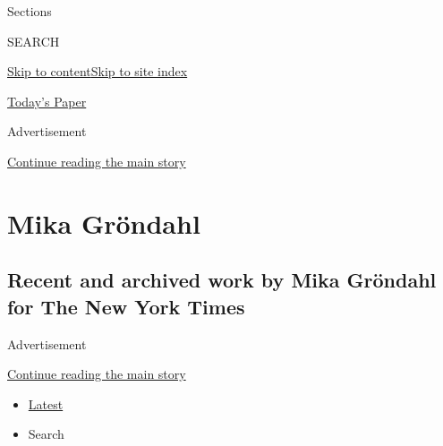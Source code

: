 Sections

SEARCH

\protect\hyperlink{site-content}{Skip to
content}\protect\hyperlink{site-index}{Skip to site index}

\href{https://myaccount.nytimes3xbfgragh.onion/auth/login?response_type=cookie\&client_id=vi}{}

\href{https://www.nytimes3xbfgragh.onion/section/todayspaper}{Today's
Paper}

Advertisement

\protect\hyperlink{after-top}{Continue reading the main story}

\hypertarget{mika-gruxf6ndahl}{%
\section{Mika Gröndahl}\label{mika-gruxf6ndahl}}

\hypertarget{recent-and-archived-work-by-mika-gruxf6ndahl-for-the-new-york-times}{%
\subsection{Recent and archived work by Mika Gröndahl for The New York
Times}\label{recent-and-archived-work-by-mika-gruxf6ndahl-for-the-new-york-times}}

Advertisement

\protect\hyperlink{after-mid1}{Continue reading the main story}

\begin{itemize}
\tightlist
\item
  \protect\hyperlink{stream-panel}{Latest}
\item
  Search
\end{itemize}

